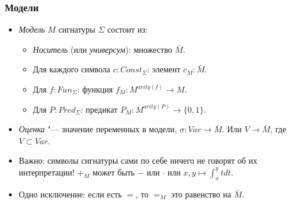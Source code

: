 \documentclass[10pt]{beamer}
\begin{document}
\begin{frame}
    \frametitle{Модели}
    \begin{itemize}
        \item \emph{Модель} $M$ сигнатуры $\Sigma$ состоит из:
        \begin{itemize}
            \item \emph{Носитель} (или \emph{универсум}): \pause множество $\bar{M}$.
            \item Для каждого символа $c : Const_\Sigma$: \pause элемент $c_M : \bar{M}$.
            \item Для $f: Fun_\Sigma$: \pause функция $f_M: M^{arity(f)} \to M$.
            \item Для $P: Pred_\Sigma$: \pause предикат $P_M: M^{arity(P)} \to \{0,1\}$.
        \end{itemize}
        \item \emph{Оценка} "--- значение переменных в модели, $\sigma : Var \to \bar{M}$. Или $V \to \bar{M}$, где $V \subset Var$.
        \item Важно: символы сигнатуры сами по себе ничего не говорят об их интерпретации! $+_M$ может быть $-$ или $\cdot$ или $x,y \mapsto \int_{x}^{y} t dt$.
        \pause 
        \item Одно исключение: если есть $=$, то $=_M$ это равенство на $\bar{M}$.
    \end{itemize}
\end{frame}
\end{document}
